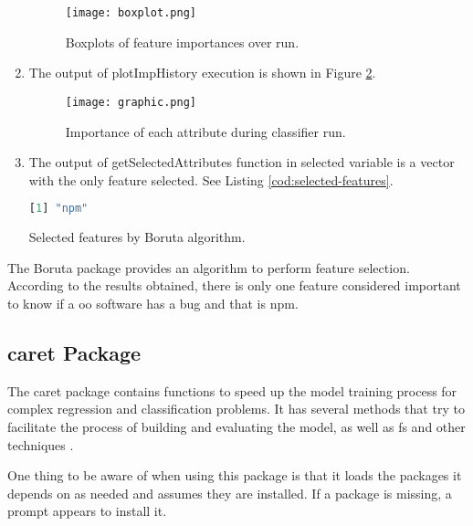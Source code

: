 \begin{enumerate}
    \begin{figure}[H]
        \centering
        \texttt{[image: boxplot.png]}
        \caption{Boxplots of feature importances over run.}
        \label{fig:boxplot}
    \end{figure}
    
    \item The output of plotImpHistory execution is shown in Figure \ref{fig:graphic}.
    
    \begin{figure}[ht]
        \centering
        \texttt{[image: graphic.png]}
        \caption{Importance of each attribute during classifier run.}
        \label{fig:graphic}
    \end{figure}
    
    \item The output of getSelectedAttributes function in selected variable is a vector with the only feature selected. See Listing \ref{cod:selected-features}.
    
\begin{codefloat}[H]
\begin{lstlisting}[language=R, style=console]
[1] "npm"
\end{lstlisting}
\caption{Selected features by Boruta algorithm.}
\label{cod:selected-features}
\end{codefloat}

\end{enumerate}

The Boruta package provides an algorithm to perform feature selection. According to the results obtained, there is only one feature considered important to know if a \acrshort{oo} software has a bug and that is \acrfull{npm}.

\subsection{caret Package}
\label{sec:caret-package}

The \acrfull{caret} package contains functions to speed up the model training process for complex regression and classification problems. It has several methods that try to facilitate the process of building and evaluating the model, as well as \acrshort{fs} and other techniques \cite{caret}.

One thing to be aware of when using this package is that it loads the packages it depends on as needed and assumes they are installed. If a package is missing, a prompt appears to install it.

